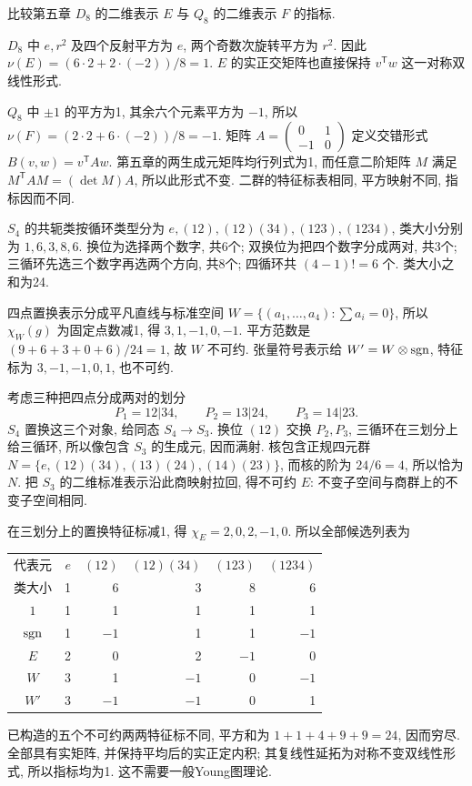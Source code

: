 \begin{example}
比较第五章 $D_8$ 的二维表示 $E$ 与 $Q_8$ 的二维表示 $F$ 的指标.
\end{example}
\begin{solution}
$D_8$ 中 $e,r^2$ 及四个反射平方为 $e$, 两个奇数次旋转平方为 $r^2$. 因此 $\nu(E)=(6\cdot2+2\cdot(-2))/8=1$. $E$ 的实正交矩阵也直接保持 $v^{\mathsf T}w$ 这一对称双线性形式.

$Q_8$ 中 $\pm1$ 的平方为1, 其余六个元素平方为 $-1$, 所以 $\nu(F)=(2\cdot2+6\cdot(-2))/8=-1$. 矩阵 $A=\begin{pmatrix}0&1\\-1&0\end{pmatrix}$ 定义交错形式 $B(v,w)=v^{\mathsf T}Aw$. 第五章的两生成元矩阵均行列式为1, 而任意二阶矩阵 $M$ 满足 $M^{\mathsf T}AM=(\det M)A$, 所以此形式不变. 二群的特征标表相同, 平方映射不同, 指标因而不同.
\end{solution}

$S_4$ 的共轭类按循环类型分为 $e,(12),(12)(34),(123),(1234)$, 类大小分别为 $1,6,3,8,6$. 换位为选择两个数字, 共6个; 双换位为把四个数字分成两对, 共3个; 三循环先选三个数字再选两个方向, 共8个; 四循环共 $(4-1)!=6$ 个. 类大小之和为24.

四点置换表示分成平凡直线与标准空间 $W=\{(a_1,\ldots,a_4):\sum a_i=0\}$, 所以 $\chi_W(g)$ 为固定点数减1, 得 $3,1,-1,0,-1$. 平方范数是 $(9+6+3+0+6)/24=1$, 故 $W$ 不可约. 张量符号表示给 $W'=W\otimes\operatorname{sgn}$, 特征标为 $3,-1,-1,0,1$, 也不可约.

考虑三种把四点分成两对的划分
\[
 P_1=12|34,\qquad P_2=13|24,\qquad P_3=14|23.
\]
$S_4$ 置换这三个对象, 给同态 $S_4\to S_3$. 换位 $(12)$ 交换 $P_2,P_3$, 三循环在三划分上给三循环, 所以像包含 $S_3$ 的生成元, 因而满射. 核包含正规四元群 $N=\{e,(12)(34),(13)(24),(14)(23)\}$, 而核的阶为 $24/6=4$, 所以恰为 $N$. 把 $S_3$ 的二维标准表示沿此商映射拉回, 得不可约 $E$: 不变子空间与商群上的不变子空间相同.

在三划分上的置换特征标减1, 得 $\chi_E=2,0,2,-1,0$. 所以全部候选列表为
\begin{center}
\begin{tabular}{c|rrrrr}
\toprule
代表元 &$e$&$(12)$&$(12)(34)$&$(123)$&$(1234)$\\
类大小 &1&6&3&8&6\\\midrule
$1$&1&1&1&1&1\\
$\operatorname{sgn}$&1&$-1$&1&1&$-1$\\
$E$&2&0&2&$-1$&0\\
$W$&3&1&$-1$&0&$-1$\\
$W'$&3&$-1$&$-1$&0&1\\\bottomrule
\end{tabular}
\end{center}
已构造的五个不可约两两特征标不同, 平方和为 $1+1+4+9+9=24$, 因而穷尽. 全部具有实矩阵, 并保持平均后的实正定内积; 其复线性延拓为对称不变双线性形式, 所以指标均为1. 这不需要一般Young图理论.

